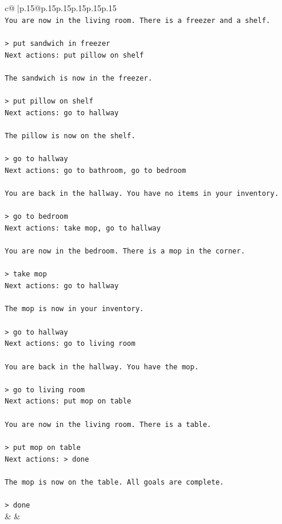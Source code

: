 \documentclass{article}
\begin{document}
{\begin{supertabular}{c@{$\;$}|p{.15\linewidth}@{}p{.15\linewidth}p{.15\linewidth}p{.15\linewidth}p{.15\linewidth}p{.15\linewidth}}
{{{\\ 
\texttt{You are now in the living room. There is a freezer and a shelf.} \\
\\ 
\texttt{> put sandwich in freezer  } \\
\texttt{Next actions: put pillow on shelf} \\
\\ 
\texttt{The sandwich is now in the freezer.} \\
\\ 
\texttt{> put pillow on shelf  } \\
\texttt{Next actions: go to hallway} \\
\\ 
\texttt{The pillow is now on the shelf.} \\
\\ 
\texttt{> go to hallway  } \\
\texttt{Next actions: go to bathroom, go to bedroom} \\
\\ 
\texttt{You are back in the hallway. You have no items in your inventory.} \\
\\ 
\texttt{> go to bedroom  } \\
\texttt{Next actions: take mop, go to hallway} \\
\\ 
\texttt{You are now in the bedroom. There is a mop in the corner.} \\
\\ 
\texttt{> take mop  } \\
\texttt{Next actions: go to hallway} \\
\\ 
\texttt{The mop is now in your inventory.} \\
\\ 
\texttt{> go to hallway  } \\
\texttt{Next actions: go to living room} \\
\\ 
\texttt{You are back in the hallway. You have the mop.} \\
\\ 
\texttt{> go to living room  } \\
\texttt{Next actions: put mop on table} \\
\\ 
\texttt{You are now in the living room. There is a table.} \\
\\ 
\texttt{> put mop on table  } \\
\texttt{Next actions: > done} \\
\\ 
\texttt{The mop is now on the table. All goals are complete.} \\
\\ 
\texttt{> done} \\
            }
        }
    }
    & & \\ \\


\end{supertabular}}
\end{document}
